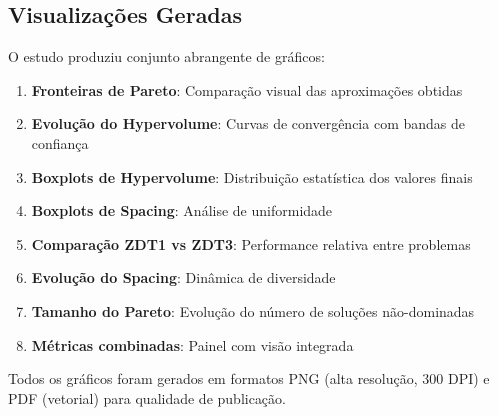 \subsection{Visualizações Geradas}

O estudo produziu conjunto abrangente de gráficos:

\begin{enumerate}
    \item \textbf{Fronteiras de Pareto}: Comparação visual das aproximações obtidas
    \item \textbf{Evolução do Hypervolume}: Curvas de convergência com bandas de confiança
    \item \textbf{Boxplots de Hypervolume}: Distribuição estatística dos valores finais
    \item \textbf{Boxplots de Spacing}: Análise de uniformidade
    \item \textbf{Comparação ZDT1 vs ZDT3}: Performance relativa entre problemas
    \item \textbf{Evolução do Spacing}: Dinâmica de diversidade
    \item \textbf{Tamanho do Pareto}: Evolução do número de soluções não-dominadas
    \item \textbf{Métricas combinadas}: Painel com visão integrada
\end{enumerate}

Todos os gráficos foram gerados em formatos PNG (alta resolução, 300 DPI) e PDF (vetorial) para qualidade de publicação.
